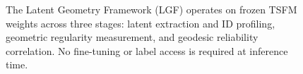 \begin{figure}[h]
  \centering
  \caption{The Latent Geometry Framework (LGF) operates on frozen
           TSFM weights across three stages: latent extraction and ID profiling,
           geometric regularity measurement, and geodesic reliability correlation.
           No fine-tuning or label access is required at inference time.}
  \label{fig:gef_pipeline}
\end{figure}
